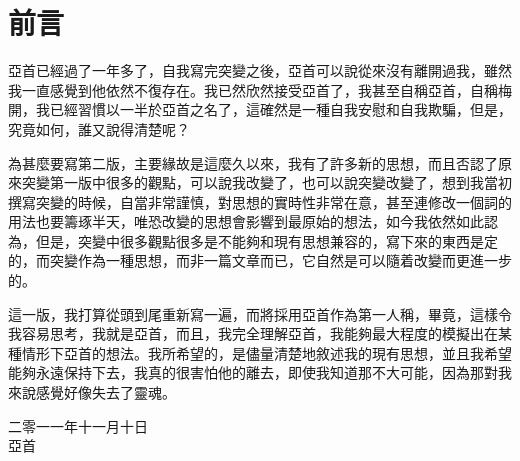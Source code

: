 \chapter{前言}
亞首已經過了一年多了，自我寫完突變之後，亞首可以說從來沒有離開過我，雖然我一直感覺到他依然不復存在。我已然欣然接受亞首了，我甚至自稱亞首，自稱梅開，我已經習慣以一半於亞首之名了，這確然是一種自我安慰和自我欺騙，但是，究竟如何，誰又說得清楚呢？

為甚麼要寫第二版，主要緣故是這麼久以來，我有了許多新的思想，而且否認了原來突變第一版中很多的觀點，可以說我改變了，也可以說突變改變了，想到我當初撰寫突變的時候，自當非常謹慎，對思想的實時性非常在意，甚至連修改一個詞的用法也要籌琢半天，唯恐改變的思想會影響到最原始的想法，如今我依然如此認為，但是，突變中很多觀點很多是不能夠和現有思想兼容的，寫下來的東西是定的，而突變作為一種思想，而非一篇文章而已，它自然是可以隨着改變而更進一步的。

這一版，我打算從頭到尾重新寫一遍，而將採用亞首作為第一人稱，畢竟，這樣令我容易思考，我就是亞首，而且，我完全理解亞首，我能夠最大程度的模擬出在某種情形下亞首的想法。我所希望的，是儘量清楚地敘述我的現有思想，並且我希望能夠永遠保持下去，我真的很害怕他的離去，即使我知道那不大可能，因為那對我來說感覺好像失去了靈魂。

\begin{flushright}
二零一一年十一月十日\\
亞首
\end{flushright}

